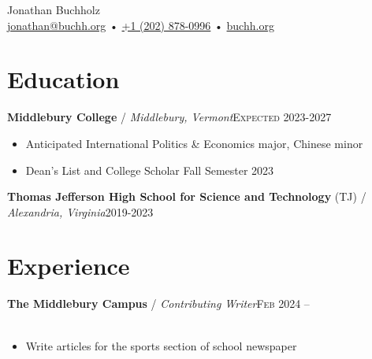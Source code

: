 \documentclass[12pt, a4paper]{article}
\begin{document}
{\LARGE Jonathan Buchholz}\\
\href{mailto:jonathan@buchh.org}{jonathan@buchh.org} • \href{tel:2028780996}{+1 (202) 878-0996} • \href{https://buchh.org}{buchh.org}\\

\vspace{-8mm}
\section*{Education}
\textbf{Middlebury College} / \textit{Middlebury, Vermont}\hfill\textsc{Expected 2023-2027}\\
\begin{itemize}
    \vspace{-8mm}
    \item Anticipated International Politics \& Economics major, Chinese minor
    \item Dean's List and College Scholar Fall Semester 2023
\end{itemize}
\textbf{Thomas Jefferson High School for Science and Technology} (TJ) / \textit{Alexandria, Virginia}\hfill\textsc{2019-2023}\\
\vspace{-4mm}

\vspace{-8mm}
\section*{Experience}

\textbf{The Middlebury Campus} / \textit{Contributing Writer}\hfill\textsc{Feb 2024 --}\\\
\begin{itemize}
    \vspace{-8mm}
    \item Write articles for the sports section of school newspaper
\end{itemize}
\end{document}
